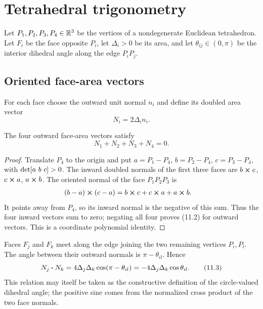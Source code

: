 \section{Tetrahedral trigonometry}
\label{sec:tetrahedron}

Let \(P_1,P_2,P_3,P_4\in\mathbb R^3\) be the vertices of a nondegenerate Euclidean
tetrahedron.  Let \(F_i\) be the face opposite \(P_i\), let \(\Delta_i>0\) be
its area, and let \(\theta_{ij}\in(0,\pi)\) be the interior dihedral angle
along the edge \(P_iP_j\).

\subsection{Oriented face-area vectors}

For each face choose the outward unit normal \(n_i\) and define its doubled
area vector
\begin{equation}
 N_i=2\Delta_i n_i.                                         \tag{11.1}
\end{equation}

\begin{lemma}
\label{lem:face-closure}
The four outward face-area vectors satisfy
\begin{equation}
 N_1+N_2+N_3+N_4=0.                                        \tag{11.2}
\end{equation}
\end{lemma}

\begin{proof}
Translate \(P_4\) to the origin and put
\(a=P_1-P_4\), \(b=P_2-P_4\), \(c=P_3-P_4\), with
\(\operatorname{det}[a\ b\ c]>0\).  The inward doubled normals of the first three faces
are \(b\mathbin{\boldsymbol{\times}} c\), \(c\mathbin{\boldsymbol{\times}} a\), \(a\mathbin{\boldsymbol{\times}} b\).  The oriented normal of
the face \(P_1P_2P_3\) is
\begin{align*}
 (b-a)\mathbin{\boldsymbol{\times}}(c-a)
 &=b\mathbin{\boldsymbol{\times}} c+c\mathbin{\boldsymbol{\times}} a+a\mathbin{\boldsymbol{\times}} b.
\end{align*}
It points away from \(P_4\), so its inward normal is the negative of this sum.
Thus the four inward vectors sum to zero; negating all four proves (11.2) for
outward vectors.  This is a coordinate polynomial identity.
\end{proof}

Faces \(F_j\) and \(F_k\) meet along the edge joining the two remaining
vertices \(P_i,P_l\).  The angle between their outward normals is
\(\pi-\theta_{il}\).  Hence
\begin{equation}
 N_j\mathbin{\boldsymbol{\cdot}} N_k
 =4\Delta_j\Delta_k\cos(\pi-\theta_{il})
 =-4\Delta_j\Delta_k\cos\theta_{il}.                       \tag{11.3}
\end{equation}
This relation may itself be taken as the constructive definition of the
circle-valued dihedral angle; the positive sine comes from the normalized
cross product of the two face normals.

